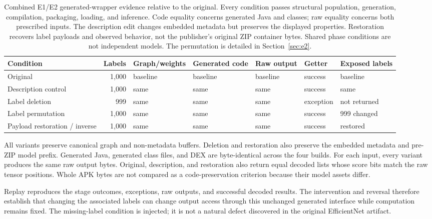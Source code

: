 \documentclass[10pt,twocolumn,letterpaper]{article}
\begin{document}
\begin{table}[t]
\centering\small
\setlength{\tabcolsep}{6pt}
\begin{tabular}{@{}lrlllll@{}}
\toprule
Condition & Labels & Graph/weights & Generated code & Raw output & Getter & Exposed labels\\
\midrule
Original & 1,000 & baseline & baseline & baseline & success & baseline\\
Description control & 1,000 & same & same & same & success & same\\
Label deletion & 999 & same & same & same & exception & not returned\\
Label permutation & 1,000 & same & same & same & success & 999 changed\\
Payload restoration / inverse & 1,000 & same & same & same & success & restored\\
\bottomrule
\end{tabular}
\caption{Combined E1/E2 generated-wrapper evidence relative to the original. Every condition passes structural population, generation, compilation, packaging, loading, and inference. Code equality concerns generated Java and classes; raw equality concerns both prescribed inputs. The description edit changes embedded metadata but preserves the displayed properties. Restoration recovers label payloads and observed behavior, not the publisher's original ZIP container bytes. Shared phase conditions are not independent models. The permutation is detailed in Section~\ref{sec:e2}.}
\label{tab:e1}
\end{table}

All variants preserve canonical graph and non-metadata buffers. Deletion and restoration also preserve the embedded metadata and pre-ZIP model prefix. Generated Java, generated class files, and DEX are byte-identical across the four builds. For each input, every variant produces the same raw output bytes. Original, description, and restoration also return equal decoded lists whose score bits match the raw tensor positions. Whole APK bytes are not compared as a code-preservation criterion because their model assets differ.

Replay reproduces the stage outcomes, exceptions, raw outputs, and successful decoded results. The intervention and reversal therefore establish that changing the associated labels can change output access through this unchanged generated interface while computation remains fixed. The missing-label condition is injected; it is not a natural defect discovered in the original EfficientNet artifact.
\end{document}

